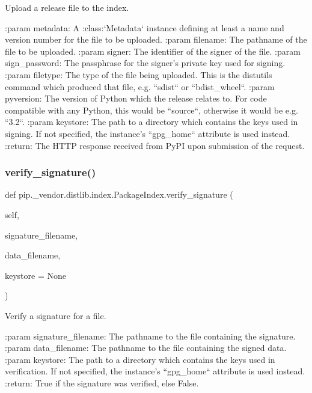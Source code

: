 \begin{DoxyVerb}Upload a release file to the index.

:param metadata: A :class:`Metadata` instance defining at least a name
         and version number for the file to be uploaded.
:param filename: The pathname of the file to be uploaded.
:param signer: The identifier of the signer of the file.
:param sign_password: The passphrase for the signer's
              private key used for signing.
:param filetype: The type of the file being uploaded. This is the
        distutils command which produced that file, e.g.
        ``sdist`` or ``bdist_wheel``.
:param pyversion: The version of Python which the release relates
          to. For code compatible with any Python, this would
          be ``source``, otherwise it would be e.g. ``3.2``.
:param keystore: The path to a directory which contains the keys
         used in signing. If not specified, the instance's
         ``gpg_home`` attribute is used instead.
:return: The HTTP response received from PyPI upon submission of the
request.
\end{DoxyVerb}
 \mbox{\label{classpip_1_1__vendor_1_1distlib_1_1index_1_1PackageIndex_a54c6290115dc97752df48e2d6a7d512c}} 
\subsubsection{\texorpdfstring{verify\+\_\+signature()}{verify\_signature()}}
{\footnotesize\ttfamily def pip.\+\_\+vendor.\+distlib.\+index.\+Package\+Index.\+verify\+\_\+signature (\begin{DoxyParamCaption}\item[{}]{self,  }\item[{}]{signature\+\_\+filename,  }\item[{}]{data\+\_\+filename,  }\item[{}]{keystore = {\ttfamily None} }\end{DoxyParamCaption})}

\begin{DoxyVerb}Verify a signature for a file.

:param signature_filename: The pathname to the file containing the
                   signature.
:param data_filename: The pathname to the file containing the
              signed data.
:param keystore: The path to a directory which contains the keys
         used in verification. If not specified, the
         instance's ``gpg_home`` attribute is used instead.
:return: True if the signature was verified, else False.
\end{DoxyVerb}
 

